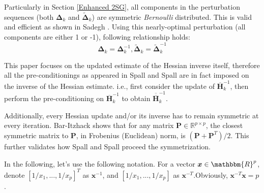 \documentclass[conference]{IEEEtran}
\newcommand{\bDelta}{\bm{\Delta}}
\newcommand{\oH}{\bm{\overline{H}}}
\newcommand{\ooH}{\bm{\overline{\overline{H}}}}
\newcommand{\tDelta}{\bm{\tilde{\Delta}}}
\begin{document}
Particularly in Section \ref{Enhanced 2SG}, all components in the perturbation sequences (both $ \bDelta_k $ and $ \tDelta_k $) are symmetric \textit{Bernoulli} distributed. This is valid and efficient as shown in Sadegh \cite{Sadegh1998}. Using this nearly-optimal perturbation (all components are either 1 or -1), following relationship holds:
\begin{equation} \label{eq:symmetry}
\bDelta_k=\bDelta_k^{-1}, \tDelta_k=\tDelta_k^{-1}
\end{equation}

This paper focuses on the updated estimate of the Hessian inverse itself, therefore all the pre-conditionings as appeared in Spall \cite{Spall2000} and Spall \cite{Spall2009} are in fact imposed on the inverse of the Hessian estimate. i.e., first consider the update of $ \oH_k^{-1} $, then perform the pre-conditioning on $ \oH_k^{-1} $ to obtain $ \ooH_k^{-1} $.

Additionally, every Hessian update and/or its inverse has to remain symmetric at every iteration. Bar-Itzhack \cite{Bar-Itzhack1998} shows that for any matrix $ \bm{P}\in\mathbb{R}^{p\times p} $, the closest symmetric matrix to $ \bm{P} $, in Frobenius (Euclidean) norm, is $ (\bm{P}+\bm{P}^T)/2 $. This further validates how Spall \cite{Spall2000} and Spall \cite{Spall2009} proceed the symmetrization.

In the following, let's use the following notation. For a vector $ \bm{x}\in \mathbbm{R}^p $, denote $ [1/x_1, ..., 1/x_p]^T $ as $ \bm{x}^{-1} $, and $ [1/x_1, ..., 1/x_p] $ as $ \bm{x}^{-T} $.Obviously, $ \bm{x}^{-T}\bm{x}=p $.
\end{document}
